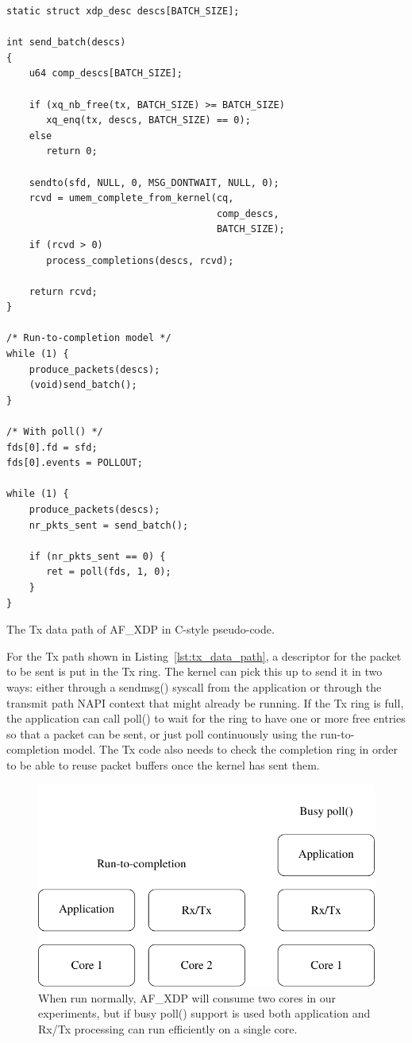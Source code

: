 \documentclass[9pt,numbers,reprint]{sigplanconf}
\begin{document}
\begin{listing}[ht]
\begin{verbatim}
static struct xdp_desc descs[BATCH_SIZE];

int send_batch(descs)
{
    u64 comp_descs[BATCH_SIZE];

    if (xq_nb_free(tx, BATCH_SIZE) >= BATCH_SIZE)
       xq_enq(tx, descs, BATCH_SIZE) == 0);
    else
       return 0;

    sendto(sfd, NULL, 0, MSG_DONTWAIT, NULL, 0);
    rcvd = umem_complete_from_kernel(cq,
                                     comp_descs,
                                     BATCH_SIZE);
    if (rcvd > 0)
       process_completions(descs, rcvd);

    return rcvd;
}

/* Run-to-completion model */
while (1) {
    produce_packets(descs);
    (void)send_batch();
}

/* With poll() */
fds[0].fd = sfd;
fds[0].events = POLLOUT;

while (1) {
    produce_packets(descs);
    nr_pkts_sent = send_batch();

    if (nr_pkts_sent == 0) {
       ret = poll(fds, 1, 0);
    }
}
\end{verbatim}
\caption{The Tx data path of AF\_XDP in C-style pseudo-code.}
\label{lst:tx_data_path}
\end{listing}

For the Tx path shown in Listing~\ref{lst:tx_data_path}, a descriptor
for the packet to be sent is put in the Tx ring. The kernel can pick
this up to send it in two ways: either through a sendmsg() syscall
from the application or through the transmit path NAPI context that
might already be running. If the Tx ring is full, the application can
call poll() to wait for the ring to have one or more free entries so
that a packet can be sent, or just poll continuously using the
run-to-completion model. The Tx code also needs to check the completion
ring in order to be able to reuse packet buffers once the kernel has
sent them.

\begin{figure}[ht]
\includegraphics[width=.48\textwidth]{two_vs_one_core.pdf}
\caption{When run normally, AF\_XDP will consume two cores in our
  experiments, but if busy poll() support is used both application and
  Rx/Tx processing can run efficiently on a single core.}
\label{fig:two_vs_one_core}
\end{figure}
\end{document}
